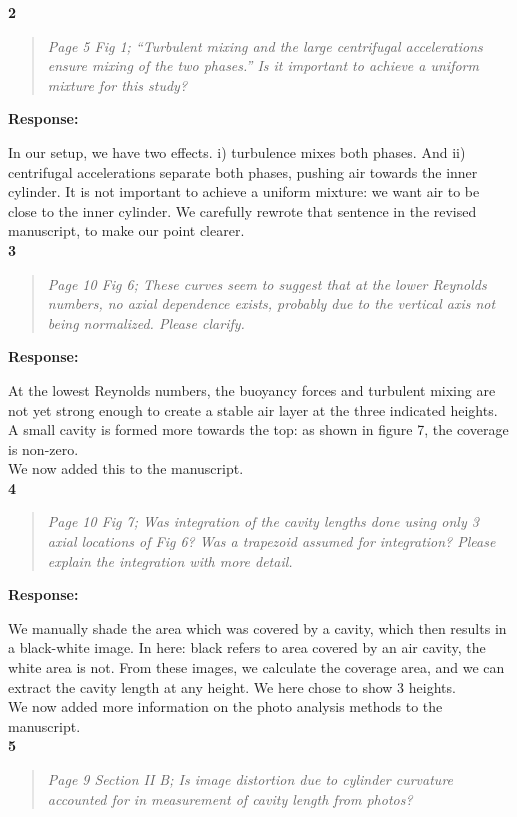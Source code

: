 \documentclass[10pt]{article}
\newcommand{\strong}[1]{\textbf{#1}}
\newcommand{\question}[1]{\begin{quote} \emph{#1}  \end{quote} }
\begin{document}
\noindent \strong{2}

\question{Page 5 Fig 1; ``Turbulent mixing and the large centrifugal accelerations ensure mixing of the two phases.'' Is it important to achieve a uniform mixture for this study? 
 }

\noindent \strong{Response:} 

\noindent In our setup, we have two effects. i) turbulence mixes both phases. And ii) centrifugal accelerations separate both phases, pushing air towards the inner cylinder. It is not important to achieve a uniform mixture: we want air to be close to the inner cylinder. 
We carefully rewrote that sentence in the revised manuscript, to make our point clearer. \\

\noindent \strong{3}

\question{Page 10 Fig 6; These curves seem to suggest that at the lower Reynolds numbers, no axial dependence exists, probably due to the vertical axis not being normalized. Please clarify.}

\noindent \strong{Response:} 

\noindent At the lowest Reynolds numbers, the buoyancy forces and turbulent mixing are not yet strong enough to create a stable air layer at the three indicated heights. A small cavity is formed more towards the top: as shown in figure 7, the coverage is non-zero. \\
We now added this to the manuscript.\\

\noindent \strong{4}

\question{Page 10 Fig 7; Was integration of the cavity lengths done using only 3 axial locations of Fig 6? Was a trapezoid assumed for integration? Please explain the integration with more detail.
 }

\noindent \strong{Response:} 

\noindent We manually shade the area which was covered by a cavity, which then results in a black-white image. In here: black refers to area covered by an air cavity, the white area is not. From these images, we calculate the coverage area, and we can extract the cavity length at any height. We here chose to show 3 heights.\\
We now added more information on the photo analysis methods to the manuscript.\\

\noindent \strong{5}

\question{Page 9 Section II B; Is image distortion due to cylinder curvature accounted for in measurement of cavity length from photos? }
\end{document}

